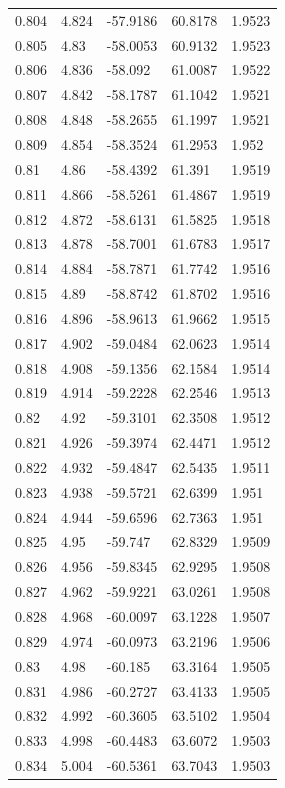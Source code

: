 \begin{tabular}{lllll}
0.804 & 4.824 & -57.9186 & 60.8178 & 1.9523 \\
0.805 & 4.83 & -58.0053 & 60.9132 & 1.9523 \\
0.806 & 4.836 & -58.092 & 61.0087 & 1.9522 \\
0.807 & 4.842 & -58.1787 & 61.1042 & 1.9521 \\
0.808 & 4.848 & -58.2655 & 61.1997 & 1.9521 \\
0.809 & 4.854 & -58.3524 & 61.2953 & 1.952 \\
0.81 & 4.86 & -58.4392 & 61.391 & 1.9519 \\
0.811 & 4.866 & -58.5261 & 61.4867 & 1.9519 \\
0.812 & 4.872 & -58.6131 & 61.5825 & 1.9518 \\
0.813 & 4.878 & -58.7001 & 61.6783 & 1.9517 \\
0.814 & 4.884 & -58.7871 & 61.7742 & 1.9516 \\
0.815 & 4.89 & -58.8742 & 61.8702 & 1.9516 \\
0.816 & 4.896 & -58.9613 & 61.9662 & 1.9515 \\
0.817 & 4.902 & -59.0484 & 62.0623 & 1.9514 \\
0.818 & 4.908 & -59.1356 & 62.1584 & 1.9514 \\
0.819 & 4.914 & -59.2228 & 62.2546 & 1.9513 \\
0.82 & 4.92 & -59.3101 & 62.3508 & 1.9512 \\
0.821 & 4.926 & -59.3974 & 62.4471 & 1.9512 \\
0.822 & 4.932 & -59.4847 & 62.5435 & 1.9511 \\
0.823 & 4.938 & -59.5721 & 62.6399 & 1.951 \\
0.824 & 4.944 & -59.6596 & 62.7363 & 1.951 \\
0.825 & 4.95 & -59.747 & 62.8329 & 1.9509 \\
0.826 & 4.956 & -59.8345 & 62.9295 & 1.9508 \\
0.827 & 4.962 & -59.9221 & 63.0261 & 1.9508 \\
0.828 & 4.968 & -60.0097 & 63.1228 & 1.9507 \\
0.829 & 4.974 & -60.0973 & 63.2196 & 1.9506 \\
0.83 & 4.98 & -60.185 & 63.3164 & 1.9505 \\
0.831 & 4.986 & -60.2727 & 63.4133 & 1.9505 \\
0.832 & 4.992 & -60.3605 & 63.5102 & 1.9504 \\
0.833 & 4.998 & -60.4483 & 63.6072 & 1.9503 \\
0.834 & 5.004 & -60.5361 & 63.7043 & 1.9503 \\

\end{tabular}
